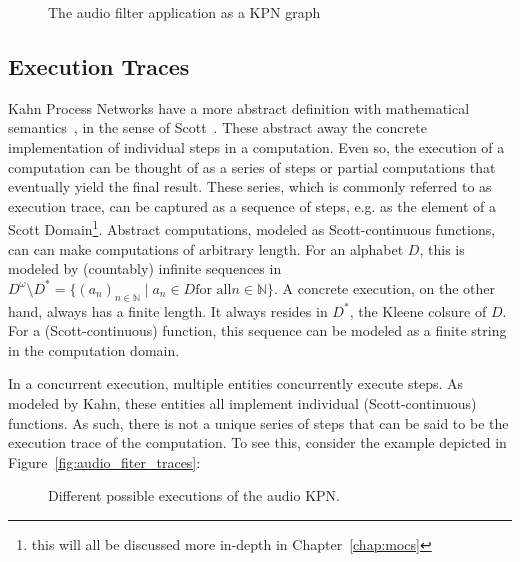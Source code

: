 \begin{figure}[h]
	\centering
   \resizebox{0.9\textwidth}{!}{}
   \caption{The audio filter application as a \ac{KPN} graph}
	\label{fig:audio_filter_graph}
\end{figure}

\subsection{Execution Traces}

Kahn Process Networks have a more abstract definition with mathematical semantics~\cite{kahn74}, in the sense of Scott~\cite{scott1970}.
These abstract away the concrete implementation of individual steps in a computation.
Even so, the execution of a computation can be thought of as a series of steps or partial computations that eventually yield the final result.
These series, which is commonly referred to as execution trace, can be captured as a sequence of steps, e.g. as the element of a Scott Domain\footnote{this will all be discussed more in-depth in Chapter~\ref{chap:mocs}}. 
Abstract computations, modeled as Scott-continuous functions, can can make computations of arbitrary length.
For an alphabet $D$, this is modeled by (countably) infinite sequences in $D^\omega \setminus D^* = \{ (a_n)_{n \in \mathbb{N}} \mid a_n \in D \text {for all} n \in \mathbb{N} \}$.
A concrete execution, on the other hand, always has a finite length.
It always resides in $D^*$, the Kleene colsure of $D$.
For a (Scott-continuous) function, this sequence can be modeled as a finite string in the computation domain.

In a concurrent execution, multiple entities concurrently execute steps.
As modeled by Kahn, these entities all implement individual (Scott-continuous) functions.
As such, there is not a unique series of steps that can be said to be the execution trace of the computation.
To see this, consider the example depicted in Figure~\ref{fig:audio_fiter_traces}:

\begin{figure}[h]
	\centering
   \resizebox{0.7\textwidth}{!}{}
   \caption{Different possible executions of the audio \ac{KPN}.}
	\label{fig:audio_filter_traces}
\end{figure}


